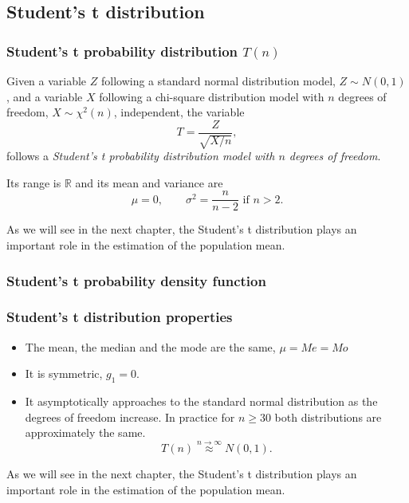 \subsection{Student's t distribution}

\begin{frame}
\frametitle{Student's t probability distribution $T(n)$}
\begin{definition}
Given a variable $Z$ following a standard normal distribution model, $Z\sim N(0,1)$, and a variable $X$ following a
chi-square distribution model with $n$ degrees of freedom, $X\sim \chi^2(n)$,  independent, the variable 
\[
T = \frac{Z}{\sqrt{X/n}},
\]
follows a \emph{Student's t probability distribution model with $n$ degrees of freedom}.
\end{definition}

Its range is $\mathbb{R}$ and its mean and variance are
\[
\mu = 0, \qquad \sigma^2 = \frac{n}{n-2} \mbox{ if $n>2$}.
\]

As we will see in the next chapter, the Student's t distribution plays an important role in the estimation of the
population mean.
\end{frame}


\begin{frame}
\frametitle{Student's t probability density function}

\begin{center}
\end{center}
\end{frame}


\begin{frame}
\frametitle{Student's t distribution properties}
\begin{itemize}
\item The mean, the median and the mode are the same, $\mu=Me=Mo$
\item It is symmetric, $g_1=0$.
\item It asymptotically approaches to the standard normal distribution as the degrees of freedom increase. 
In practice for $n\geq 30$ both distributions are approximately the same. 
\[
T(n)\stackrel{n\rightarrow \infty}{\approx}N(0,1).
\]
\end{itemize}
As we will see in the next chapter, the Student’s t distribution plays an important role in the estimation of the population mean.
\end{frame}


